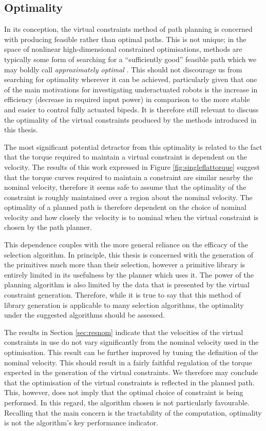 \subsection{Optimality}
In its conception, the virtual constraints method of path planning is concerned with producing feasible rather than optimal paths. This is not unique; in the space of nonlinear high-dimensional constrained optimisations, methods are typically some form of searching for a ``sufficiently good'' feasible path which we may boldly call \textit{approximately optimal} \cite{kavraki1996probabilistic, hwang1992potential, quinlan1993elastic}. This should not discourage us from searching for optimality wherever it can be achieved, particularly given that one of the main motivations for investigating underactuated robots is the increase in efficiency (decrease in required input power) in comparison to the more stable and easier to control fully actuated bipeds. It is therefore still relevant to discuss the optimality of the virtual constraints produced by the methods introduced in this thesis. 

The most significant potential detractor from this optimality is related to the fact that the torque required to maintain a virtual constraint is dependent on the velocity. The results of this work expressed in Figure \ref{fig:singleflattorque} suggest that the torque curves required to maintain a constraint are similar nearby the nominal velocity, therefore it seems safe to assume that the optimality of the constraint is roughly maintained over a region about the nominal velocity. The optimality of a planned path is therefore dependent on the choice of nominal velocity and how closely the velocity is to nominal when the virtual constraint is chosen by the path planner.

This dependence couples with the more general reliance on the efficacy of the selection algorithm. In principle, this thesis is concerned with the generation of the primitives much more than their selection, however a primitive library is entirely limited in its usefulness by the planner which uses it. The power of the planning algorithm is also limited by the data that is presented by the virtual constraint generation. Therefore, while it is true to say that this method of library generation is applicable to many selection algorithms, the optimality under the suggested algorithms should be assessed.

The results in Section \ref{sec:resnom} indicate that the velocities of the virtual constraints in use do not vary significantly from the nominal velocity used in the optimisation. This result can be further improved by tuning the definition of the nominal velocity. This should result in a fairly faithful regulation of the torque expected in the generation of the virtual constraints. We therefore may conclude that the optimisation of the virtual constraints is reflected in the planned path. This, however, does not imply that the optimal choice of constraint is being performed. In this regard, the algorithm chosen is not particularly favourable. Recalling that the main concern is the tractability of the computation, optimality is not the algorithm's key performance indicator.

